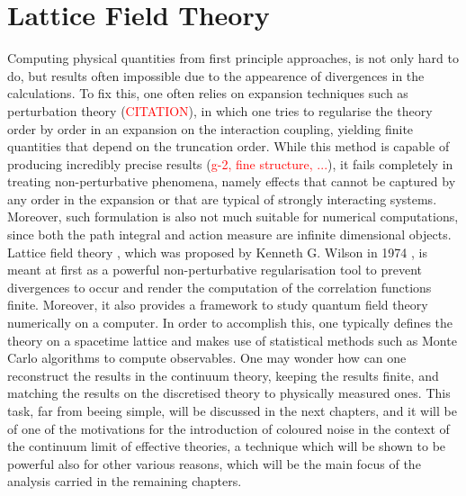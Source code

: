 \section{Lattice Field Theory}
\vspace{20pt}
Computing physical quantities from first principle approaches, is not only hard to do, but results often impossible due to the appearence of divergences in the calculations. To fix this, one often relies on expansion techniques such as perturbation theory (\textcolor{red}{CITATION}), in which one tries to regularise the theory order by order in an expansion on the interaction coupling, yielding finite quantities that depend on the truncation order.  While this method is capable of producing incredibly precise results (\textcolor{red}{g-2, fine structure, ...}), it fails completely in treating non-perturbative phenomena, namely effects that cannot be captured by any order in the expansion or that are typical of strongly interacting systems.
Moreover, such formulation is also not much suitable for numerical computations, since both the path integral and action measure are infinite dimensional objects. \\
Lattice field theory \cite{Montvay1994QuantumLattice,rothe_LGT,gattringer_LQCD,creutz_2023}, which was proposed by Kenneth G. Wilson in 1974 \cite{wilson_lqcd}, is meant at first as a powerful non-perturbative regularisation tool to prevent divergences to occur and render the computation of the correlation functions finite. Moreover, it also provides a framework to study quantum field theory numerically on a computer. In order to accomplish this, one typically defines the theory on a spacetime lattice and makes use of statistical methods such as Monte Carlo algorithms to compute observables. One may wonder how can one reconstruct the results in the continuum theory, keeping the results finite, and matching the results on the discretised theory to physically measured ones. This task, far from beeing simple, will be  discussed in the next chapters, and it will be of one of the motivations for the introduction of coloured noise in the context of the continuum limit of effective theories, a technique which will be shown to be powerful also for other various reasons, which will be the main focus of the analysis carried in the remaining chapters. \\

